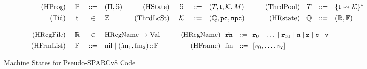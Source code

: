 \begin{figure*}[!t]
    \centering
    \small
    \vspace{-1em}
    \[
        \begin{array}{rcclrcclrccl}
            \TYPE{(HProg)} & \ \HProg \ & \define &
            (\HMd, \hpstate) &
            \qquad
            \TYPE{(HState)} & \ \hpstate \ & \define &
            (\thrdpool, \thrdid, \hthrdlocalst, \Mem) &
            \qquad
            \TYPE{(ThrdPool)} & \thrdpool & \define &
            \{ \thrdid \rightsquigarrow \hthrdlocalst \}^{*}
            \\
            \\[-8pt]
            \TYPE{(Tid)} & \thrdid & \in & \Ztype &
            \TYPE{(ThrdLcSt)} & \ \hthrdlocalst \ & \define &
            (\hRstate, \pc, \npc) &
            \TYPE{(HRstate)} & \hRstate & \define &
            (\hRfile, \hWstk) \\
            \\

            \TYPE{(HRegFile)} & \hRfile & \in &
            \multicolumn{9}{l}
            {
                \TYPE{HRegName} \rightarrow \TYPE{Val}
                \qquad\quad
                \TYPE{(HRegName)} \ \ \hrn \ \ \define \ \
                \reg{0} \sepline \dots \sepline \reg{31} \sepline
                \regn \sepline \regz \sepline \regc \sepline \regv
            }
            \\
            \\[-8pt]
            \TYPE{(HFrmList)} & \hWstk & \define &
            \multicolumn{9}{l}
            {
                \nil \sepline (\fm_1, \fm_2) \stCons \hWstk
                \qquad\qquad \ \
                \TYPE{(HFrame)} \ \ \fm \ \ \define \ \
                [\val_0, \dots, \val_7]
            }
        \end{array}
    \]
    \caption{Machine States for Pseudo-SPARCv8 Code}
    \label{fig:machine-state-concur-pseudo-sparc}
\end{figure*}

